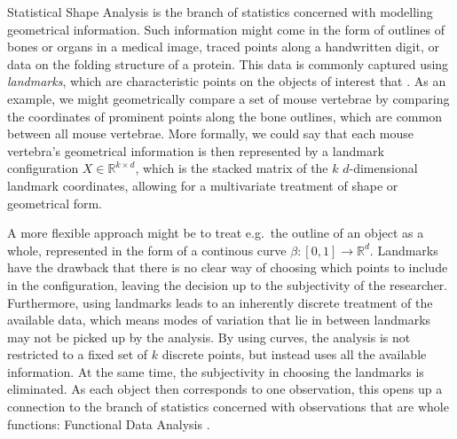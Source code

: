 Statistical Shape Analysis \parencite[see e.g.][]{DrydenMardia2016} is the branch of statistics concerned with modelling geometrical information.
Such information might come in the form of outlines of bones or organs in a medical image, traced points along a handwritten digit, or data on the folding structure of a protein.
This data is commonly captured using \emph{landmarks}, which are characteristic points on the objects of interest that .
As an example, we might geometrically compare a set of mouse vertebrae by comparing the coordinates of prominent points along the bone outlines, which are common between all mouse vertebrae.
More formally, we could say that each mouse vertebra's geometrical information is then represented by a landmark configuration $X \in \mathbb{R}^{k \times d}$, which is the stacked matrix of the $k$ $d$-dimensional landmark coordinates, allowing for a multivariate treatment of shape or geometrical form.

A more flexible approach might be to treat e.g.\ the outline of an object as a whole, represented in the form of a continous curve $\beta : [0,1] \rightarrow \mathbb{R}^d$. 
Landmarks have the drawback that there is no clear way of choosing which points to include in the configuration, leaving the decision up to the subjectivity of the researcher. 
Furthermore, using landmarks leads to an inherently discrete treatment of the available data, which means modes of variation that lie in between landmarks may not be picked up by the analysis.  
By using curves, the analysis is not restricted to a fixed set of $k$ discrete points, but instead uses all the available information.
At the same time, the subjectivity in choosing the landmarks is eliminated.
As each object then corresponds to one observation, this opens up a connection to the branch of statistics concerned with observations that are whole functions: Functional Data Analysis \parencite[see e.g.][]{RamsaySilverman2005}.

